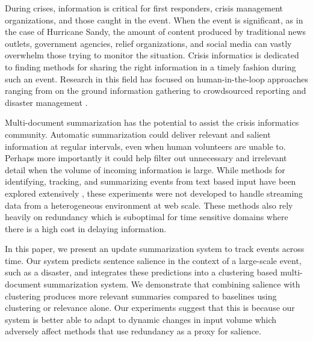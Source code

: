 \label{sec:introduction}
During crises, information is critical for first responders,
 crisis management organizations, and those caught in the event.  
When the event is significant, as in the case of Hurricane
Sandy, the amount of content produced by traditional news outlets,
government agencies, relief organizations, and social media can vastly
overwhelm those trying to monitor the situation. 
Crisis informatics \cite{palen2010vision} is dedicated to finding methods for sharing the
right information in a timely fashion during such an event.
Research in this field has focused on
human-in-the-loop approaches ranging from on the ground information 
gathering to crowdsourced reporting and disaster management \cite{starbird2013working}.

Multi-document summarization has the potential to assist the crisis 
informatics community. 
Automatic summarization could deliver
relevant and salient information at regular intervals, 
even when human volunteers are unable to. 
Perhaps more importantly it could help filter out
unnecessary and irrelevant detail when the volume of incoming information
is large. 
While methods for identifying,
tracking, and summarizing events from text based input have been explored
extensively
\cite{allan1998topic,Filatova&Hatzivassiloglou.04a,Wang&al.11}, 
these experiments were not developed to handle streaming data from a
 heterogeneous environment at web scale. 
These methods also rely heavily on redundancy which is suboptimal for time
sensitive domains where there is a high cost in delaying information.

In this paper, we present an update summarization system to track events
across time. Our system predicts sentence salience in the context of a
large-scale event, such as a disaster, and integrates these predictions into
a clustering based multi-document summarization system. 
We demonstrate that combining salience with clustering produces more relevant summaries
compared to baselines using clustering or relevance alone.  
Our experiments suggest that this
is because our system is better able to adapt to
dynamic changes in input volume which adversely 
affect methods that use redundancy as a proxy for salience. 


